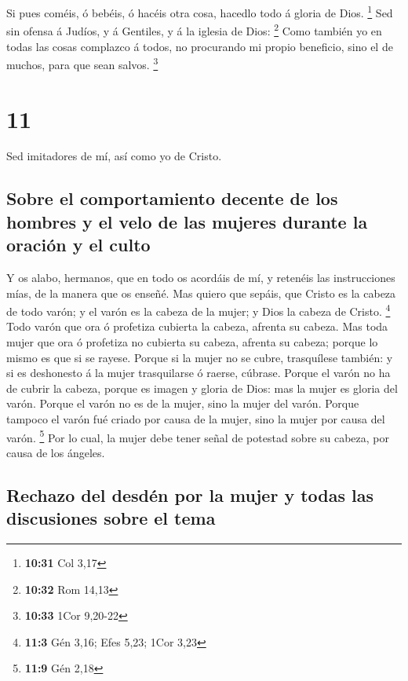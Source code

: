  Si pues coméis, ó bebéis, ó hacéis otra cosa, hacedlo todo
á gloria de Dios. \footnote{\textbf{10:31} Col 3,17}  Sed
sin ofensa á Judíos, y á Gentiles, y á la iglesia de Dios: \footnote{\textbf{10:32}
  Rom 14,13}  Como también yo en todas las cosas complazco
á todos, no procurando mi propio beneficio, sino el de muchos, para que
sean salvos. \footnote{\textbf{10:33} 1Cor 9,20-22}

\hypertarget{section-10}{%
\section{11}\label{section-10}}

 Sed imitadores de mí, así como yo de Cristo.

\hypertarget{sobre-el-comportamiento-decente-de-los-hombres-y-el-velo-de-las-mujeres-durante-la-oraciuxf3n-y-el-culto}{%
\subsection{Sobre el comportamiento decente de los hombres y el velo de
las mujeres durante la oración y el
culto}\label{sobre-el-comportamiento-decente-de-los-hombres-y-el-velo-de-las-mujeres-durante-la-oraciuxf3n-y-el-culto}}

 Y os alabo, hermanos, que en todo os acordáis de mí, y
retenéis las instrucciones mías, de la manera que os enseñé.
 Mas quiero que sepáis, que Cristo es la cabeza de todo
varón; y el varón es la cabeza de la mujer; y Dios la cabeza de Cristo.
\footnote{\textbf{11:3} Gén 3,16; Efes 5,23; 1Cor 3,23} 
Todo varón que ora ó profetiza cubierta la cabeza, afrenta su cabeza.
 Mas toda mujer que ora ó profetiza no cubierta su cabeza,
afrenta su cabeza; porque lo mismo es que si se rayese. 
Porque si la mujer no se cubre, trasquílese también: y si es deshonesto
á la mujer trasquilarse ó raerse, cúbrase.  Porque el varón
no ha de cubrir la cabeza, porque es imagen y gloria de Dios: mas la
mujer es gloria del varón.  Porque el varón no es de la
mujer, sino la mujer del varón.  Porque tampoco el varón fué
criado por causa de la mujer, sino la mujer por causa del varón.
\footnote{\textbf{11:9} Gén 2,18}  Por lo cual, la mujer
debe tener señal de potestad sobre su cabeza, por causa de los ángeles.

\hypertarget{rechazo-del-desduxe9n-por-la-mujer-y-todas-las-discusiones-sobre-el-tema}{%
\subsection{Rechazo del desdén por la mujer y todas las discusiones
sobre el
tema}\label{rechazo-del-desduxe9n-por-la-mujer-y-todas-las-discusiones-sobre-el-tema}}

